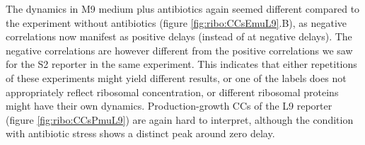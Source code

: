 %
%
The dynamics in M9 medium plus antibiotics again seemed different compared to the experiment without antibiotics (figure \ref{fig:ribo:CCsEmuL9}.B), as negative correlations now manifest as positive delays (instead of at negative delays).
The negative correlations are however different from the positive correlations we saw for the S2 reporter in the same experiment.
%
This indicates that either repetitions of these experiments might yield different results, or one of the labels does not appropriately reflect ribosomal concentration, or different ribosomal proteins might have their own dynamics.
%
Production-growth CCs of the L9 reporter (figure \ref{fig:ribo:CCsPmuL9}) are again hard to interpret, although the condition with antibiotic stress shows a distinct peak around zero delay.

